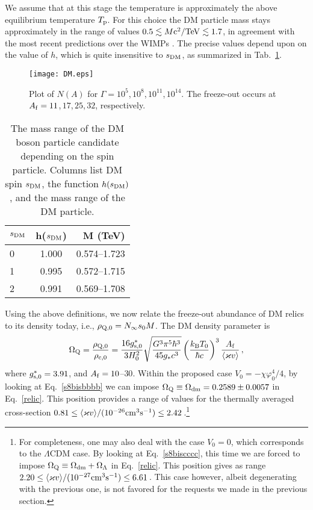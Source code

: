 \documentclass[twocolumn,showpacs, nofootinbib,aps,superscriptaddress, eqsecnum,prd,prl,notitlepage,showkeys,10pt,reprint]{revtex4-1}
\begin{document}
We assume that at this stage the temperature is approximately the above equilibrium temperature $T_{\rm p}$.
For this choice the DM particle mass stays approximately in the range of values $0.5\lesssim M{\rm c^2/ TeV} \lesssim 1.7$, in agreement with the most recent predictions over the WIMPs \cite{2002JHEP...12..034K,PhysRevLett.84.5699,2002PhLB..545...43B}.
The precise values depend upon on the value of $h$, which is quite insensitive to $s_{\rm DM}$, as summarized in Tab.~\ref{tab:table1}.
%
\begin{figure}
\centering
\texttt{[image: DM.eps]}
\caption{Plot of $N(A)$ for $\Gamma=10^5$,\,$10^8$,\,$10^{11}$,\,$10^{14}$. The freeze-out occurs at $A_{\rm f}=11$,\,$17$,\,$25$,\,$32$, respectively.}
\label{fig:2}
\end{figure}

\begin{table}
\caption{\label{tab:table1}The mass range of the DM boson particle candidate depending on the spin particle. Columns list DM spin $s_{\rm DM}$, the function $h(s_{\rm DM})$, and the mass range of the DM particle.}
\begin{ruledtabular}
\begin{tabular}{lcr}
$s_{\rm DM}$	&	h($s_{\rm DM}$)	&	M (TeV)\\
\hline
0				& 	1.000			& 	0.574--1.723\\
1				&	0.995			&	0.572--1.715\\
2				&	0.991			&	0.569--1.708
\end{tabular}
\end{ruledtabular}
\end{table}

Using the above definitions, we now relate the freeze-out abundance of DM relics to its density today, i.e., $\rho_{\rm Q,0}=N_\infty s_0 M$. The DM density parameter is
%
\begin{equation}
\label{relic}
\Omega_{\rm Q}=\frac{\rho_{\rm Q,0}}{\rho_{\rm c,0}}=\frac{16g^{*}_{\rm s,0}}{3H_0^2}\sqrt{\frac{G^3\pi^5\hbar^3}{45g_{*}c^3}}\left(\frac{k_{\rm B}T_0}{\hbar c}\right)^3\frac{A_{\rm f}}{\langle \varkappa v\rangle}\,,
\end{equation}
%
where $g^{*}_{\rm s,0}=3.91$, and $A_{\rm f}=10$--$30$.
Within the proposed case $V_0= -\chi\varphi_0^4/4$, by looking at Eq.~\eqref{s8bisbbbb} we can impose $\Omega_{\rm Q}\equiv\Omega_{\rm dm}=0.2589\pm0.0057$ \cite{2016A&A...594A..13P} in Eq.~\eqref{relic}.
This position provides a range of values for the thermally averaged cross-section $0.81\leq\langle \varkappa v\rangle/(10^{-26}{\rm cm}^3{\rm s}^{-1})\leq2.42$\,.\footnote{For completeness, one may also deal with the case $V_0=0$, which corresponds to the $\Lambda$CDM case.
By looking at Eq.~\eqref{s8biscccc}, this time we are forced to impose $\Omega_{\rm Q}\equiv\Omega_{\rm dm}+\Omega_\Lambda$ in Eq.~\eqref{relic}. This position gives as range $2.20\leq\langle \varkappa v\rangle/(10^{-27}{\rm cm}^3{\rm s}^{-1})\leq6.61$\,. This case however, albeit degenerating with the previous one, is not favored for the requests we made in the previous section.}
\end{document}
